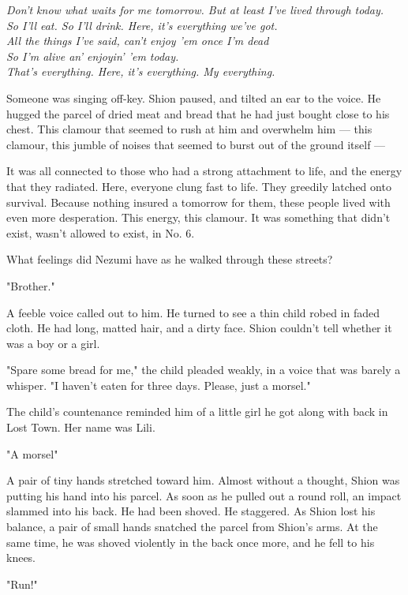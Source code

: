\myspace

\emph{Don't know what waits for me tomorrow. But at least I've lived through
today.\\
So I'll eat. So I'll drink. Here, it's everything we've got.\\
All the things I've said, can't enjoy 'em once I'm dead\\
So I'm alive an' enjoyin' 'em today.\\
That's everything. Here, it's everything. My everything.}

\myspace

Someone was singing off-key. Shion paused, and tilted an ear to the
voice. He hugged the parcel of dried meat and bread that he had just
bought close to his chest. This clamour that seemed to rush at him and
overwhelm him --- this clamour, this jumble of noises that seemed to burst
out of the ground itself ---

It was all connected to those who had a strong attachment to life, and
the energy that they radiated. Here, everyone clung fast to life. They
greedily latched onto survival. Because nothing insured a tomorrow for
them, these people lived with even more desperation. This energy, this
clamour. It was something that didn't exist, wasn't allowed to exist, in
No. 6.

What feelings did Nezumi have as he walked through these streets?

"Brother."

A feeble voice called out to him. He turned to see a thin child robed in
faded cloth. He had long, matted hair, and a dirty face. Shion couldn't
tell whether it was a boy or a girl.

"Spare some bread for me," the child pleaded weakly, in a voice that was
barely a whisper. "I haven't eaten for three days. Please, just a
morsel."

The child's countenance reminded him of a little girl he got along with
back in Lost Town. Her name was Lili.

"A morsel\el "

A pair of tiny hands stretched toward him. Almost without a thought,
Shion was putting his hand into his parcel. As soon as he pulled out a
round roll, an impact slammed into his back. He had been shoved. He
staggered. As Shion lost his balance, a pair of small hands snatched the
parcel from Shion's arms. At the same time, he was shoved violently in
the back once more, and he fell to his knees.

"Run!"

